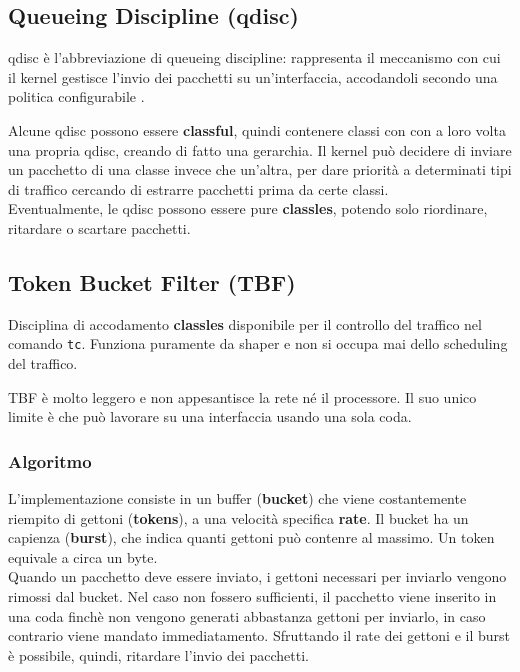 \subsection{Queueing Discipline (qdisc)}
\begin{defn}[qdisc]
  qdisc è l'abbreviazione di queueing discipline: rappresenta il meccanismo con cui il kernel gestisce l'invio dei pacchetti su un'interfaccia,
  accodandoli secondo una politica configurabile \cite{tc}.
\end{defn}
Alcune qdisc possono essere \textbf{classful}, quindi contenere classi con con a loro volta una propria qdisc, creando di fatto una gerarchia.
Il kernel può decidere di inviare un pacchetto di una classe invece che un'altra, per dare priorità a determinati tipi di traffico cercando di estrarre pacchetti prima da certe classi. \\
\vspace*{0.01\textheight}
Eventualmente, le qdisc possono essere pure \textbf{classles}, potendo solo riordinare, ritardare o scartare pacchetti.

\subsection{Token Bucket Filter (TBF)}
\label{sec:tbf}
\begin{defn}
  Disciplina di accodamento \textbf{classles} disponibile per il controllo del traffico nel comando \texttt{tc}.
  Funziona puramente da shaper e non si occupa mai dello scheduling del traffico. \cite{tc-tbf}
\end{defn}
TBF è molto leggero e non appesantisce la rete né il processore. Il suo unico limite è che può lavorare su una interfaccia usando una sola coda.

\subsubsection{Algoritmo}
L'implementazione consiste in un buffer (\textbf{bucket}) che viene costantemente riempito di gettoni (\textbf{tokens}), a una velocità specifica \textbf{rate}.
Il bucket ha un capienza (\textbf{burst}), che indica quanti gettoni può contenre al massimo. Un token equivale a circa un byte. \\ 
\vspace*{0.01\textheight}
Quando un pacchetto deve essere inviato, i gettoni necessari per inviarlo vengono rimossi dal bucket.
Nel caso non fossero sufficienti, il pacchetto viene inserito in una coda finchè non vengono generati abbastanza gettoni per inviarlo, in caso contrario viene mandato immediatamento.
Sfruttando il rate dei gettoni e il burst è possibile, quindi, ritardare l'invio dei pacchetti.

